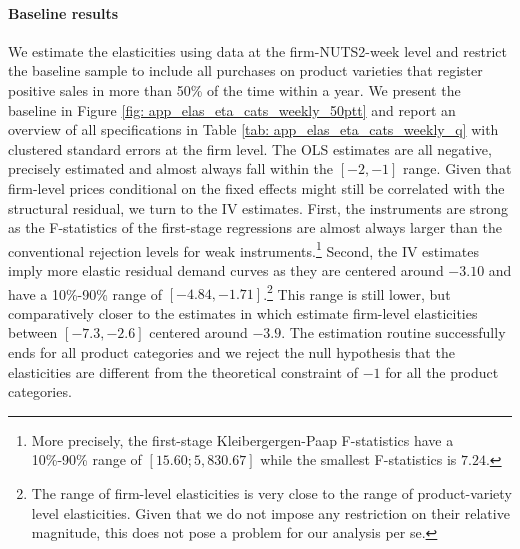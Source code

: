 \paragraph{Baseline results}    We estimate the elasticities using data at the firm-NUTS2-week level and restrict the baseline sample to include all purchases on product varieties that register positive sales in more than 50\% of the time within a year. We present the baseline in Figure \ref{fig: app_elas_eta_cats_weekly_50ptt} and report an overview of all specifications in Table \ref{tab: app_elas_eta_cats_weekly_q} with clustered standard errors at the firm level. The OLS estimates are all negative, precisely estimated and almost always fall within the $[-2,-1]$ range. Given that firm-level prices conditional on the fixed effects might still be correlated with the structural residual, we turn to the IV estimates. First, the instruments are strong as the F-statistics of the first-stage regressions are almost always larger than the conventional rejection levels for weak instruments.\footnote{More precisely, the first-stage Kleibergergen-Paap F-statistics have a 10\%-90\% range of $[15.60;5,830.67]$ while the smallest F-statistics is $7.24$.} Second, the IV estimates imply more elastic residual demand curves as they are centered around $-3.10$ and have a 10\%-90\% range of $[-4.84,-1.71]$.\footnote{The range of firm-level elasticities is very close to the range of product-variety level elasticities. Given that we do not impose any restriction on their relative magnitude, this does not pose a problem for our analysis per se.} This range is still lower, but comparatively closer to the estimates in \citet{Hottman2016} which estimate firm-level elasticities between $[-7.3,-2.6]$ centered around $-3.9$. The estimation routine successfully ends for all product categories and we reject the null hypothesis that the elasticities are different from the theoretical constraint of $-1$ for all the product categories.

